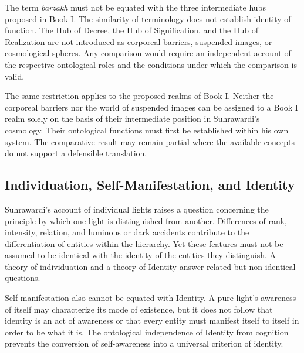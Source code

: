 The term \textit{barzakh} must not be
equated with the three intermediate
hubs proposed in Book I. The
similarity of terminology does
not establish identity of function.
The Hub of Decree, the Hub of
Signification, and the Hub of
Realization are not introduced
as corporeal barriers, suspended
images, or cosmological spheres.
Any comparison would require
an independent account of the
respective ontological roles
and the conditions under which
the comparison is valid.

\label{para:VS.B01.P01.C08.S14.SS14.P004}

The same restriction applies to the
proposed realms of Book I. Neither
the corporeal barriers nor the
world of suspended images can
be assigned to a Book I realm
solely on the basis of their
intermediate position in
Suhrawardi's cosmology. Their
ontological functions must first
be established within his own
system. The comparative result
may remain partial where the
available concepts do not
support a defensible translation.


\subsection{Individuation, Self-Manifestation, and Identity}
\label{sec:ch08-s14-ss15}

\label{para:VS.B01.P01.C08.S14.SS15.P001}

Suhrawardi's account of individual lights
raises a question concerning the
principle by which one light is
distinguished from another. Differences
of rank, intensity, relation, and
luminous or dark accidents contribute
to the differentiation of entities
within the hierarchy. Yet these
features must not be assumed to
be identical with the identity
of the entities they distinguish.
A theory of individuation and
a theory of Identity answer
related but non-identical questions.

\label{para:VS.B01.P01.C08.S14.SS15.P002}

Self-manifestation also cannot be
equated with Identity. A pure
light's awareness of itself may
characterize its mode of existence,
but it does not follow that
identity is an act of awareness
or that every entity must
manifest itself to itself in
order to be what it is. The
ontological independence of
Identity from cognition prevents
the conversion of self-awareness
into a universal criterion
of identity.


